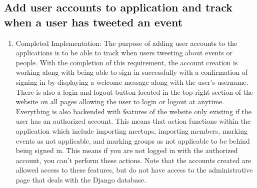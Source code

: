 \documentclass[draftclsnofoot,10pt,onecolumn]{IEEEtran} %
\begin{document}
\subsection{Add user accounts to application and track when a user has tweeted an event}
\begin{enumerate}
  \item Completed Implementation: The purpose of adding user accounts to the applications
    is to be able to track when users tweeting about events or people. With the completion
    of this requirement, the account creation is working along with being able to sign in 
    successfully with a confirmation of signing in by displaying a welcome message along with
    the user's username. There is also a login and logout button located in the
    top right section of the website on all pages allowing the user to login or
    logout at anytime. Everything is also backended with features of the website only existing
    if the user has an authorized account. This means that action functions within the application
    which include importing meetups, importing members, marking events as not
    applicable, and marking groups as not applicable to be behind being signed in.
    This means if you are not logged in with the authorized account, you can't perform these 
    actions. Note that the accounts created are allowed access to these features, but do not
    have access to the administrative page that deals with the Django database.

\end{enumerate}
\fi

\iffalse
\subsection{List tweets about events and/or people via the application}
\begin{enumerate}
  \item Completed Implementation: We were unable to track the precise tweets
    made from our application, but we have found an alternative that mostly
    works. As shown in the code snippet, the website makes a call to Twitter's
    search API, requesting all tweets that contain a certain hashtag as well as
    the hashtag \#Meetup. The hashtags are the same as the ones used to get
    events from meetup.com. Once it has the tweets, it uses the id from each one
    to make another call to Twitter's OEmbed API, which sends back HTML that is
    used in the page's template to present embedded tweets to users. This still
    pulls a few tweets that are unrelated, but bit of filtering would work.
    Unfortunately this would be difficult, and is outside the scope of our
    project.
\end{enumerate}
\fi
\end{document}
